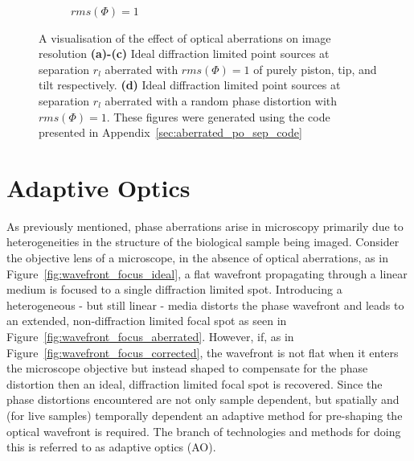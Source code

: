 \begin{figure}
\begin{subfigure}{0.49\textwidth}
		\caption{$rms(\Phi) = 1$}
		\label{fig:Airy_ring_2D_2_object_seperation_aberration_comparison_rms_1}
	\end{subfigure}
	\caption[A visualisation of the effect of optical aberrations on image 
	resolution]{A visualisation of the effect of optical aberrations on 
		image resolution \textbf{(a)-(c)} Ideal diffraction limited point 
		sources at separation $r_{l}$ aberrated with $rms(\Phi) = 1$ of purely 
		piston, tip, and tilt respectively. \textbf{(d)} Ideal diffraction 
		limited point sources at separation $r_{l}$ aberrated with a random 
		phase distortion with $rms(\Phi) = 1$. These figures were 
		generated using the code presented in 
		Appendix~\ref{sec:aberrated_po_sep_code}}
	\label{fig:aberrations_res}
\end{figure}

\section{Adaptive Optics}
\label{sec:AO}

As previously mentioned, phase aberrations arise in microscopy primarily
due to heterogeneities in the structure of the biological sample being 
imaged. Consider the objective lens of a microscope, in the absence of
optical aberrations, as in Figure~\ref{fig:wavefront_focus_ideal}, a flat
wavefront propagating through a linear medium is focused to a single 
diffraction limited spot. Introducing a heterogeneous - but still linear 
- media distorts the phase wavefront and leads to an extended, 
non-diffraction limited focal spot as seen in 
Figure~\ref{fig:wavefront_focus_aberrated}. However, if, as in 
Figure~\ref{fig:wavefront_focus_corrected}, the wavefront is not flat when 
it enters the microscope objective but instead shaped to compensate for 
the phase distortion then an ideal, diffraction limited focal spot is 
recovered. Since the phase distortions encountered are not only sample
dependent, but spatially and (for live samples) temporally dependent an
adaptive method for pre-shaping the optical wavefront is 
required\cite{schwertner2004characterizing,wang2014multiplexed,girkin2009adaptive}.
The branch of technologies and methods for doing this is referred to as
adaptive optics (AO).

